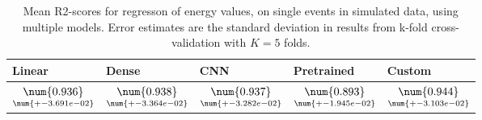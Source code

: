 \begin{table}
\centering
\caption{
Mean R2-scores for regresson of energy values, on single events in simulated data, using multiple models. 
Error estimates are the standard deviation in results from k-fold cross-validation 
with $K=5$ folds.
}
\label{tab:regression-simulated-single-energy-r2}
\begin{tabular}{lllll}
\toprule
                                             Linear &                                               Dense &                                                 CNN &                                          Pretrained &                                              Custom \\
\midrule
 $\underset{\num{+- 3.691e-02 }  }{\num{ 0.936 } }$ &  $\underset{\num{+- 3.364e-02 }  }{\num{ 0.938 } }$ &  $\underset{\num{+- 3.282e-02 }  }{\num{ 0.937 } }$ &  $\underset{\num{+- 1.945e-02 }  }{\num{ 0.893 } }$ &  $\underset{\num{+- 3.103e-02 }  }{\num{ 0.944 } }$ \\
\bottomrule
\end{tabular}
\end{table}
